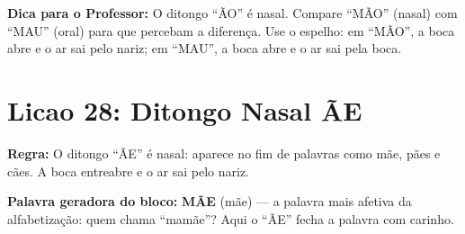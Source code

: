 \begin{dica}
\textbf{Dica para o Professor:} O ditongo ``\~AO'' \'e nasal. Compare ``M\~AO'' (nasal) com ``MAU'' (oral) para que percebam a diferen\c{c}a. Use o espelho: em ``M\~AO'', a boca abre e o ar sai pelo nariz; em ``MAU'', a boca abre e o ar sai pela boca.
\end{dica}

\section{Licao 28: Ditongo Nasal \~AE}

\rotinasimples
{}



\textbf{Regra:} O ditongo ``\~AE'' \'e nasal: aparece no fim de palavras como m\~ae, p\~aes e c\~aes. A boca entreabre e o ar sai pelo nariz.

\textbf{Palavra geradora do bloco:} \textbf{M\~AE} (m\~ae) --- a palavra mais afetiva da alfabetiza\c{c}\~ao: quem chama ``mam\~ae''? Aqui o ``\~AE'' fecha a palavra com carinho.

